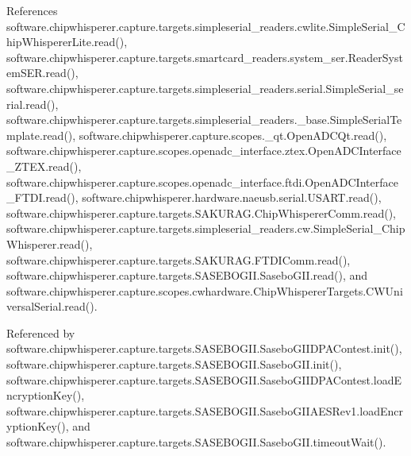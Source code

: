 References software.\+chipwhisperer.\+capture.\+targets.\+simpleserial\+\_\+readers.\+cwlite.\+Simple\+Serial\+\_\+\+Chip\+Whisperer\+Lite.\+read(), software.\+chipwhisperer.\+capture.\+targets.\+smartcard\+\_\+readers.\+system\+\_\+ser.\+Reader\+System\+S\+E\+R.\+read(), software.\+chipwhisperer.\+capture.\+targets.\+simpleserial\+\_\+readers.\+serial.\+Simple\+Serial\+\_\+serial.\+read(), software.\+chipwhisperer.\+capture.\+targets.\+simpleserial\+\_\+readers.\+\_\+base.\+Simple\+Serial\+Template.\+read(), software.\+chipwhisperer.\+capture.\+scopes.\+\_\+qt.\+Open\+A\+D\+C\+Qt.\+read(), software.\+chipwhisperer.\+capture.\+scopes.\+openadc\+\_\+interface.\+ztex.\+Open\+A\+D\+C\+Interface\+\_\+\+Z\+T\+E\+X.\+read(), software.\+chipwhisperer.\+capture.\+scopes.\+openadc\+\_\+interface.\+ftdi.\+Open\+A\+D\+C\+Interface\+\_\+\+F\+T\+D\+I.\+read(), software.\+chipwhisperer.\+hardware.\+naeusb.\+serial.\+U\+S\+A\+R\+T.\+read(), software.\+chipwhisperer.\+capture.\+targets.\+S\+A\+K\+U\+R\+A\+G.\+Chip\+Whisperer\+Comm.\+read(), software.\+chipwhisperer.\+capture.\+targets.\+simpleserial\+\_\+readers.\+cw.\+Simple\+Serial\+\_\+\+Chip\+Whisperer.\+read(), software.\+chipwhisperer.\+capture.\+targets.\+S\+A\+K\+U\+R\+A\+G.\+F\+T\+D\+I\+Comm.\+read(), software.\+chipwhisperer.\+capture.\+targets.\+S\+A\+S\+E\+B\+O\+G\+I\+I.\+Sasebo\+G\+I\+I.\+read(), and software.\+chipwhisperer.\+capture.\+scopes.\+cwhardware.\+Chip\+Whisperer\+Targets.\+C\+W\+Universal\+Serial.\+read().



Referenced by software.\+chipwhisperer.\+capture.\+targets.\+S\+A\+S\+E\+B\+O\+G\+I\+I.\+Sasebo\+G\+I\+I\+D\+P\+A\+Contest.\+init(), software.\+chipwhisperer.\+capture.\+targets.\+S\+A\+S\+E\+B\+O\+G\+I\+I.\+Sasebo\+G\+I\+I.\+init(), software.\+chipwhisperer.\+capture.\+targets.\+S\+A\+S\+E\+B\+O\+G\+I\+I.\+Sasebo\+G\+I\+I\+D\+P\+A\+Contest.\+load\+Encryption\+Key(), software.\+chipwhisperer.\+capture.\+targets.\+S\+A\+S\+E\+B\+O\+G\+I\+I.\+Sasebo\+G\+I\+I\+A\+E\+S\+Rev1.\+load\+Encryption\+Key(), and software.\+chipwhisperer.\+capture.\+targets.\+S\+A\+S\+E\+B\+O\+G\+I\+I.\+Sasebo\+G\+I\+I.\+timeout\+Wait().


